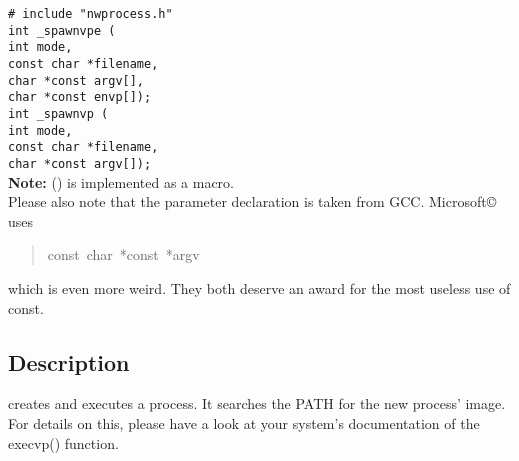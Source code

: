 \documentclass[11pt,a4paper]{article}%
\begin{document}
{\tt\# include "nwprocess.h"\\[2ex]
int \_spawnvpe (\\
\hspace*{1em}int mode,\\ 
\hspace*{1em}const char *filename,\\
\hspace*{1em}char *const argv[],\\
\hspace*{1em}char *const envp[]);\\[2ex]
int \_spawnvp (\\
\hspace*{1em}int mode,\\ 
\hspace*{1em}const char *filename,\\
\hspace*{1em}char *const argv[]);}\\[2ex]
\textbf{Note:} {\Tt{}()} is implemented as a macro.\\
Please also note that the parameter declaration is taken from GCC. 
Microsoft\copyright{} uses
\begin {quote}
  {\Tt{}const\ char\ *const\ *argv}
\end {quote}
which is even more weird. They both deserve an award for the
most useless use of {\Tt{}const}.

\subsection {Description}

{\Tt{}} creates and executes a process. It searches
the PATH for the new process' image. For details on this,
please have a look at your system's documentation of the
{\Tt{}execvp()} function.
\end{document}
